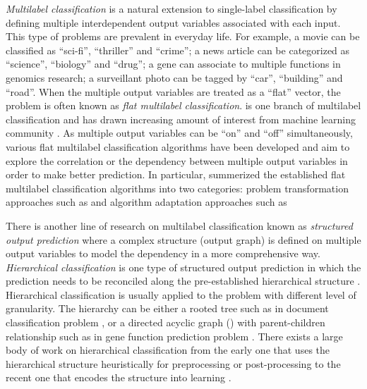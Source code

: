 \textit{Multilabel classification} is a natural extension to single-label classification by defining multiple interdependent output variables associated with each input.
This type of problems are prevalent in everyday life.
For example, a movie can be classified as ``sci-fi'', ``thriller'' and ``crime''; a news article can be categorized as ``science'', ``biology'' and ``drug''; a gene can associate to multiple functions in genomics research; a surveillant photo can be tagged by ``car'', ``building'' and ``road''. 
When the multiple output variables are treated as a ``flat'' vector, the problem is often known as \textit{flat multilabel classification}.
 is one branch of multilabel classification and has drawn increasing amount of interest from machine learning community \citep{Tsoumakas07multi,Tsoumakas10mining}.
As multiple output variables can be ``on'' and ``off'' simultaneously, various flat multilabel classification algorithms have been developed and aim to explore the correlation or the dependency between multiple output variables in order to make better prediction.
In particular, \citet{Tsoumakas07multi} summerized the established flat multilabel classification algorithms into two categories: problem transformation approaches such as \citep{Zhang05a,Read09classifier,Cheng09combining} and algorithm adaptation approaches such as \citep{Schapire99improved,Bian12corrlog}


There is another line of research on multilabel classification known as \textit{structured output prediction} where a complex structure (output graph) is defined on multiple output variables to model the dependency in a more comprehensive way.
\textit{Hierarchical classification} is one type of structured output prediction in which the prediction needs to be reconciled along the pre-established hierarchical structure \citep{Silla11a}.
Hierarchical classification is usually applied to the problem with different level of granularity. 
The hierarchy can be either a rooted tree such as in document classification problem \citep{Hao07hierarchicaly,Li07hierarchical,Rousu06}, or a directed acyclic graph (\daggraph) with parent-children relationship such as in gene function prediction problem \citep{Barutcuoglu06hierarchical}.
There exists a large body of work on hierarchical classification from the early one that uses the hierarchical structure heuristically for preprocessing or post-processing \citep{Koller97hierarchically,Dumais00Hierarchical,Liu05support,DeCoro07bayesian} to the recent one that encodes the structure into learning \citep{Cai04hierarchical,Cesabianchi05incremental,Rousu06,Gopal12bayesian}.

